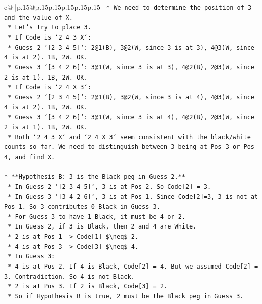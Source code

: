\documentclass{article}
\begin{document}
{\begin{supertabular}{c@{$\;$}|p{.15\linewidth}@{}p{.15\linewidth}p{.15\linewidth}p{.15\linewidth}p{.15\linewidth}p{.15\linewidth}}
{{{\texttt{    *   We need to determine the position of 3 and the value of X.} \\
\texttt{    *   Let's try to place 3.} \\
\texttt{        *   If Code is `2 4 3 X`:} \\
\texttt{            *   Guess 2 `{[}2 3 4 5{]}`: 2@1(B), 3@2(W, since 3 is at 3), 4@3(W, since 4 is at 2). 1B, 2W. OK.} \\
\texttt{            *   Guess 3 `{[}3 4 2 6{]}`: 3@1(W, since 3 is at 3), 4@2(B), 2@3(W, since 2 is at 1). 1B, 2W. OK.} \\
\texttt{        *   If Code is `2 4 X 3`:} \\
\texttt{            *   Guess 2 `{[}2 3 4 5{]}`: 2@1(B), 3@2(W, since 3 is at 4), 4@3(W, since 4 is at 2). 1B, 2W. OK.} \\
\texttt{            *   Guess 3 `{[}3 4 2 6{]}`: 3@1(W, since 3 is at 4), 4@2(B), 2@3(W, since 2 is at 1). 1B, 2W. OK.} \\
\texttt{    *   Both `2 4 3 X` and `2 4 X 3` seem consistent with the black/white counts so far. We need to distinguish between 3 being at Pos 3 or Pos 4, and find X.} \\
\\ 
\texttt{*   **Hypothesis B: 3 is the Black peg in Guess 2.**} \\
\texttt{    *   In Guess 2 `{[}2 3 4 5{]}`, 3 is at Pos 2. So Code{[}2{]} = 3.} \\
\texttt{    *   In Guess 3 `{[}3 4 2 6{]}`, 3 is at Pos 1. Since Code{[}2{]}=3, 3 is not at Pos 1. So 3 contributes 0 Black in Guess 3.} \\
\texttt{    *   For Guess 3 to have 1 Black, it must be 4 or 2.} \\
\texttt{    *   In Guess 2, if 3 is Black, then 2 and 4 are White.} \\
\texttt{        *   2 is at Pos 1 {-}> Code{[}1{]} \$\textbackslash{}neq\$ 2.} \\
\texttt{        *   4 is at Pos 3 {-}> Code{[}3{]} \$\textbackslash{}neq\$ 4.} \\
\texttt{    *   In Guess 3:} \\
\texttt{        *   4 is at Pos 2. If 4 is Black, Code{[}2{]} = 4. But we assumed Code{[}2{]} = 3. Contradiction. So 4 is not Black.} \\
\texttt{        *   2 is at Pos 3. If 2 is Black, Code{[}3{]} = 2.} \\
\texttt{        *   So if Hypothesis B is true, 2 must be the Black peg in Guess 3.} \\
}}}
\end{supertabular}}
\end{document}
